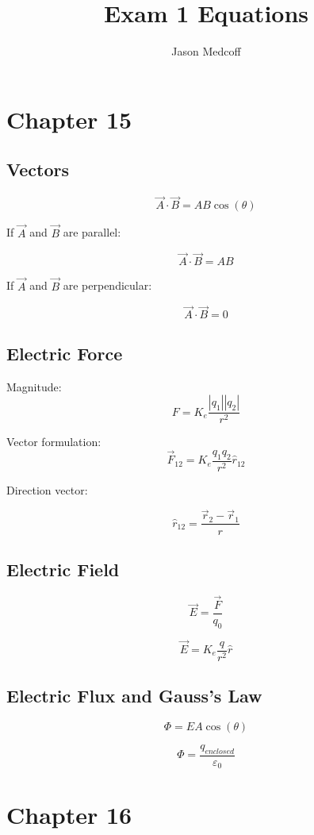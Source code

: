 \documentclass{article}
\title{Exam 1 Equations}
\author{Jason Medcoff}
\begin{document}
	
	\maketitle
	
	\section{Chapter 15}
	
	\subsection{Vectors}
	
	$$ \vec{A} \cdot \vec{B} = AB\cos(\theta) $$
	
	If $\vec{A}$ and $\vec{B}$ are parallel:
	
	$$ \vec{A} \cdot \vec{B} = AB $$
	
	If $\vec{A}$ and $\vec{B}$ are perpendicular:
	
	$$ \vec{A} \cdot \vec{B} = 0 $$
	
	
	\subsection{Electric Force}
	
	Magnitude:
	$$ F = K_e \frac{|q_1||q_2|}{r^2} $$
	
	Vector formulation:
	$$ \vec{F}_{12} = K_e \frac{q_1q_2}{r^2} \hat{r}_{12} $$
	
	Direction vector:
	
	$$ \hat{r}_{12} = \frac{\vec{r}_2 - \vec{r}_1}{r} $$
	
	\subsection{Electric Field}
	
	$$ \vec{E} = \frac{\vec{F}}{q_0} $$
	
	$$ \vec{E} = K_e \frac{q}{r^2} \hat{r} $$
	
	
	\subsection{Electric Flux and Gauss's Law}
	
	$$ \Phi = EA\cos(\theta) $$
	
	$$ \Phi = \frac{q_{enclosed}}{\varepsilon_0} $$
	
	\section{Chapter 16}
	
\end{document}
